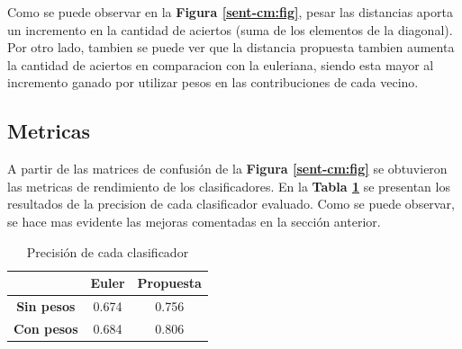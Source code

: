\documentclass[a4paper]{article}
\newcommand{\reffig}[1]{\textbf{Figura \ref{#1}}}
\newcommand{\reftable}[1]{\textbf{Tabla \ref{#1}}}
\begin{document}
Como se puede observar en la \reffig{sent-cm:fig}, pesar las distancias aporta un incremento en la cantidad de aciertos (suma de los elementos de la diagonal). Por otro lado, tambien se puede ver que la distancia propuesta tambien aumenta la cantidad de aciertos en comparacion con la euleriana, siendo esta mayor al incremento ganado por utilizar pesos en las contribuciones de cada vecino.

\subsection{Metricas}
A partir de las matrices de confusión de la \reffig{sent-cm:fig} se obtuvieron las metricas de rendimiento de los clasificadores. En la \reftable{tab:sent-prec} se presentan los resultados de la precision de cada clasificador evaluado. Como se puede observar, se hace mas evidente las mejoras comentadas en la sección anterior.

\begin{table}[h]
  \centering
  \begin{tabular}{@{}ccc@{}}
    \toprule
    \multicolumn{1}{l}{} & \textbf{Euler} & \textbf{Propuesta} \\ \midrule
    \textbf{Sin pesos}   & 0.674          & 0.756              \\
    \textbf{Con pesos}   & 0.684          & 0.806              \\ \bottomrule
    \end{tabular}
  \caption{Precisión de cada clasificador}
  \label{tab:sent-prec}
  \end{table}
\end{document}
